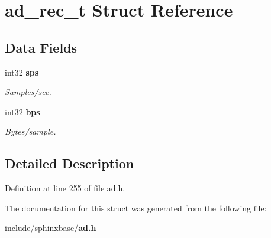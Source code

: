 \section{ad\-\_\-rec\-\_\-t Struct Reference}
\label{structad__rec__t}
\subsection*{Data Fields}
\begin{DoxyCompactItemize}
\item 
int32 {\bf sps}\label{structad__rec__t_ac8ccccdc755f68cb4ad24007b36d6c8a}

\begin{DoxyCompactList}\small\item\em Samples/sec. \end{DoxyCompactList}\item 
int32 {\bf bps}\label{structad__rec__t_ade5a608978908d87deea7fa9827f8510}

\begin{DoxyCompactList}\small\item\em Bytes/sample. \end{DoxyCompactList}\end{DoxyCompactItemize}


\subsection{Detailed Description}


Definition at line 255 of file ad.\-h.



The documentation for this struct was generated from the following file\-:\begin{DoxyCompactItemize}
\item 
include/sphinxbase/{\bf ad.\-h}\end{DoxyCompactItemize}
